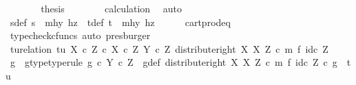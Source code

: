 \begin{isabellebody}
\ \ \ \ \isamarkupfalse%
\ \isamarkupfalse%
\ {\isacharquery}{\kern0pt}thesis\isanewline
\ \ \ \ \ \ \isamarkupfalse%
\ calculation\ \isamarkupfalse%
\ auto\isanewline
\ \ \isamarkupfalse%
\isanewline
\ \ \isamarkupfalse%
\ \isamarkupfalse%
\ s{\isacharunderscore}{\kern0pt}def{\isacharcolon}{\kern0pt}\ {\isachardoublequoteopen}s\ {\isacharequal}{\kern0pt}\ {\isasymlangle}mhy{}{\isacharcomma}{\kern0pt}\ hz{\isasymrangle}{\isachardoublequoteclose}\ \ t{\isacharunderscore}{\kern0pt}def{\isacharcolon}{\kern0pt}\ {\isachardoublequoteopen}t\ {\isacharequal}{\kern0pt}\ {\isasymlangle}mhy{}{\isacharcomma}{\kern0pt}\ hz{\isasymrangle}{\isachardoublequoteclose}\isanewline
\ \ \ \ \isamarkupfalse%
\ cart{\isacharunderscore}{\kern0pt}prod{\isacharunderscore}{\kern0pt}eq{}\ \isamarkupfalse%
\ {\isacharparenleft}{\kern0pt}typecheck{\isacharunderscore}{\kern0pt}cfuncs{\isacharcomma}{\kern0pt}\ auto{\isacharcomma}{\kern0pt}\ presburger{\isacharparenright}{\kern0pt}\isanewline
\isanewline
\ \ \isamarkupfalse%
\ tu{\isacharunderscore}{\kern0pt}relation{\isacharcolon}{\kern0pt}\ {\isachardoublequoteopen}{\isasymlangle}t{\isacharcomma}{\kern0pt}u{\isasymrangle}\ {\isasymin}\isactrlbsub {\isacharparenleft}{\kern0pt}X\ {\isasymtimes}\isactrlsub c\ Z{\isacharparenright}{\kern0pt}\ {\isasymtimes}\isactrlsub c\ X\ {\isasymtimes}\isactrlsub c\ Z\isactrlesub \ {\isacharparenleft}{\kern0pt}Y\ {\isasymtimes}\isactrlsub c\ Z{\isacharcomma}{\kern0pt}\ distribute{\isacharunderscore}{\kern0pt}right\ X\ X\ Z\ {\isasymcirc}\isactrlsub c\ m\ {\isasymtimes}\isactrlsub f\ id\isactrlsub c\ Z{\isacharparenright}{\kern0pt}{\isachardoublequoteclose}\isanewline
\ \ \isamarkupfalse%
\ \isamarkupfalse%
\ g\ \ g{\isacharunderscore}{\kern0pt}type{\isacharbrackleft}{\kern0pt}type{\isacharunderscore}{\kern0pt}rule{\isacharbrackright}{\kern0pt}{\isacharcolon}{\kern0pt}\ {\isachardoublequoteopen}g\ {\isasymin}\isactrlsub c\ Y\ {\isasymtimes}\isactrlsub c\ Z{\isachardoublequoteclose}\ \ g{\isacharunderscore}{\kern0pt}def{\isacharcolon}{\kern0pt}\ {\isachardoublequoteopen}{\isacharparenleft}{\kern0pt}distribute{\isacharunderscore}{\kern0pt}right\ X\ X\ Z\ {\isasymcirc}\isactrlsub c\ m\ {\isasymtimes}\isactrlsub f\ id\isactrlsub c\ Z{\isacharparenright}{\kern0pt}\ {\isasymcirc}\isactrlsub c\ g\ {\isacharequal}{\kern0pt}\ {\isasymlangle}t{\isacharcomma}{\kern0pt}u{\isasymrangle}{\isachardoublequoteclose}\isanewline

\end{isabellebody}

